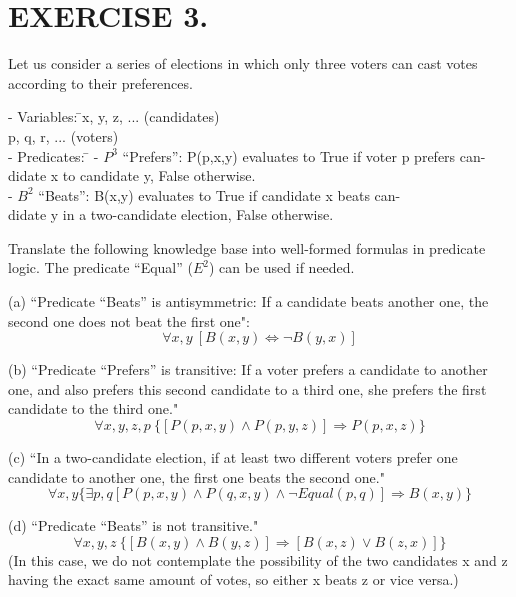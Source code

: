 \documentclass{article}
\begin{document}
\section*{EXERCISE 3.}
Let us consider a series of elections in which only three voters
can cast votes according to their preferences.\\
\begin{tabbing}
- Variables:  \= \>x, y, z, ... (candidates)\\ \>p, q, r, ... (voters)\\
- Predicates:  \= 
\> - $P^3$ “Prefers”: P(p,x,y) evaluates to True if voter p prefers
can-\\ \>didate x to candidate y, False otherwise.\\
\> - $B^2$ “Beats”: B(x,y) evaluates to True if candidate x beats
can-\\ \>didate y in a two-candidate election, False otherwise.
\end{tabbing}
Translate the following knowledge base into well-formed formulas in predicate
logic. The predicate “Equal” ($E^2$) can be used if needed.

(a) ``Predicate “Beats” is antisymmetric: If a candidate beats another one, the
second one does not beat the first one":
$$\forall x, y\ [B(x,y)\iff \neg B(y,x)]$$

(b) ``Predicate “Prefers” is transitive: If a voter prefers a candidate to another one, and also prefers this second candidate to a third one, she prefers the first candidate to the third one."
$$\forall x,y,z,p \ \{[P(p,x,y)\land P(p,y,z)] \Longrightarrow P(p,x,z)\}$$

(c) ``In a two-candidate election, if at least two different voters prefer one
candidate to another one, the first one beats the second one."
$$\forall x,y\{\exists p,q [P(p,x,y)\land P(q,x,y)\land \neg Equal(p,q)]\Longrightarrow B(x,y)\}$$

(d) ``Predicate “Beats” is not transitive."
$$\forall x,y,z \ \{[B(x,y)\land B(y,z)]\Longrightarrow [B(x,z)\lor B(z,x)]\}$$ (In this case, we do not contemplate the possibility of the two candidates x and z having the exact same amount of votes, so either x beats z or vice versa.)
\end{document}
